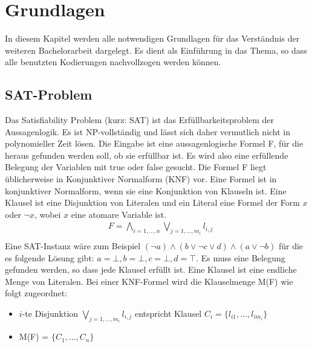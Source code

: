 \documentclass[a4,abstract=on]{scrartcl}
\newcommand*\stdsection{}
\let\stdsection\section
\renewcommand*\section{%
    \clearpage\ifodd\value{page}\else\mbox{}\clearpage\fi
    \stdsection}
\begin{document}
\section{Grundlagen}
In diesem Kapitel werden alle notwendigen Grundlagen für das Verständnis der weiteren Bachelorarbeit dargelegt. Es dient als Einführung in das Thema, so dass alle benutzten Kodierungen nachvollzogen werden können.
\subsection{SAT-Problem}
Das Satisfiability Problem (kurz: SAT) ist das Erfüllbarkeitsproblem der Aussagenlogik. Es ist NP-vollständig und lässt sich daher vermutlich nicht in polynomieller Zeit lösen. Die Eingabe ist eine aussagenlogische Formel F, für die heraus gefunden werden soll, ob sie erfüllbar ist. Es wird also eine erfüllende Belegung der Variablen mit true oder false gesucht. Die Formel F liegt üblicherweise in Konjunktiver Normalform (KNF) vor. Eine Formel ist in konjunktiver Normalform, wenn sie eine Konjunktion von Klauseln ist. Eine Klausel ist eine Disjunktion von Literalen und ein Literal eine Formel der Form $x$ oder $\neg x$, wobei $x$ eine atomare Variable ist.\\
\begin{align}
&F = \bigwedge_{i=1, \dots ,n} \bigvee_{j=1,\dots ,m_i}{l_{i,j}}\\
\end{align}
Eine SAT-Instanz wäre zum Beispiel $(\neg a) \wedge (b \vee \neg c \vee d) \wedge (a \vee \neg b)$  für die es folgende Lösung gibt: $a = \bot, b = \bot, c= \bot, d = \top$. Es muss eine Belegung gefunden werden, so dass jede Klausel erfüllt ist.
Eine Klausel ist eine endliche Menge von Literalen. Bei einer KNF-Formel wird die Klauselmenge M(F) wie folgt zugeordnet:\\
\begin{itemize}
\item $i$-te Disjunktion $\bigvee_{j=1,\dots ,m_i}{l_{i,j}}$ entspricht Klausel $C_i = \{l_{i1}, \dots, l_{im_i}\}$
\item M(F) = $\{C_1, \dots, C_n\}$
\end{itemize}
\end{document}
